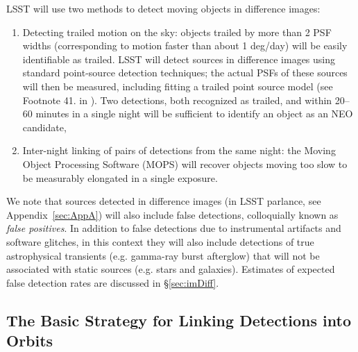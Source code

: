 LSST will use two methods to detect moving objects in difference images:
\begin{enumerate}
\item Detecting trailed motion on the sky: objects trailed by more
  than 2 PSF widths (corresponding to motion faster than about 1
  deg/day) will be easily identifiable as trailed. LSST will detect sources in 
  difference images using standard point-source detection techniques; the actual
  PSFs of these sources will then be measured, including fitting a trailed
  point source model (see Footnote 41. in \citep[LSST Data Products Definition Document,][]{LSE-163}).
  Two detections, both recognized as trailed, and within 20--60 minutes in a single night
  will be sufficient to identify an object as an NEO candidate,
\item Inter-night linking of pairs of detections from the same night: the Moving Object 
Processing Software (MOPS) will recover objects moving too slow to be measurably elongated in a single exposure.
\end{enumerate}

We note that sources detected in difference images (\DIASources in LSST parlance, see Appendix~\ref{sec:AppA})
will also include false detections, colloquially known as {\it false positives}.
In addition to false detections due to instrumental artifacts and software glitches,
in this context they will also include detections of true astrophysical transients
(e.g. gamma-ray burst afterglow) that will not be associated with static sources
(e.g. stars and galaxies). Estimates of expected false detection rates are discussed
in \S\ref{sec:imDiff}.



\subsection{The Basic Strategy for Linking Detections into Orbits}

